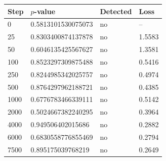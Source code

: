 \begin{tabular}{llll}
\toprule
Step & $p$-value & Detected & Loss \\
\midrule
0 & 0.5813101530075073 & no & -- \\
25 & 0.8303400874137878 & no & 1.5583 \\
50 & 0.6046135425567627 & no & 1.3581 \\
100 & 0.8523297309875488 & no & 0.5416 \\
250 & 0.8244985342025757 & no & 0.4974 \\
500 & 0.8764297962188721 & no & 0.4385 \\
1000 & 0.6776783466339111 & no & 0.5142 \\
2000 & 0.5024667382240295 & no & 0.3964 \\
4000 & 0.949506402015686 & no & 0.2882 \\
6000 & 0.6830558776855469 & no & 0.2794 \\
7500 & 0.895175039768219 & no & 0.2649 \\
\bottomrule
\end{tabular}
